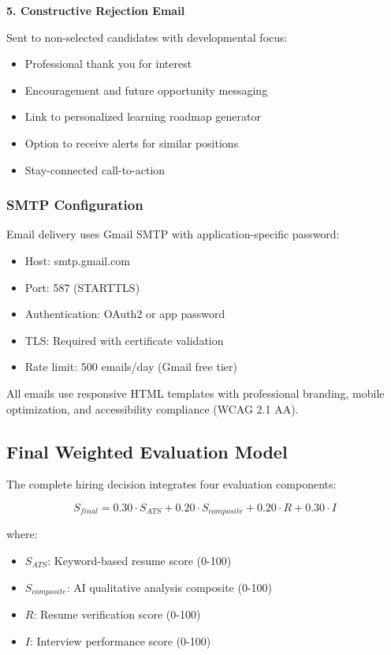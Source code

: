 \documentclass[conference]{IEEEtran}
\begin{document}
\textbf{5. Constructive Rejection Email}

Sent to non-selected candidates with developmental focus:
\begin{itemize}
    \item Professional thank you for interest
    \item Encouragement and future opportunity messaging
    \item Link to personalized learning roadmap generator
    \item Option to receive alerts for similar positions
    \item Stay-connected call-to-action
\end{itemize}

\subsubsection{SMTP Configuration}

Email delivery uses Gmail SMTP with application-specific password:
\begin{itemize}
    \item Host: smtp.gmail.com
    \item Port: 587 (STARTTLS)
    \item Authentication: OAuth2 or app password
    \item TLS: Required with certificate validation
    \item Rate limit: 500 emails/day (Gmail free tier)
\end{itemize}

All emails use responsive HTML templates with professional branding, mobile optimization, and accessibility compliance (WCAG 2.1 AA).

\subsection{Final Weighted Evaluation Model}

The complete hiring decision integrates four evaluation components:

\begin{equation}
S_{final} = 0.30 \cdot S_{ATS} + 0.20 \cdot S_{composite} + 0.20 \cdot R + 0.30 \cdot I
\end{equation}

where:
\begin{itemize}
    \item $S_{ATS}$: Keyword-based resume score (0-100)
    \item $S_{composite}$: AI qualitative analysis composite (0-100)
    \item $R$: Resume verification score (0-100)
    \item $I$: Interview performance score (0-100)
\end{itemize}
\end{document}
